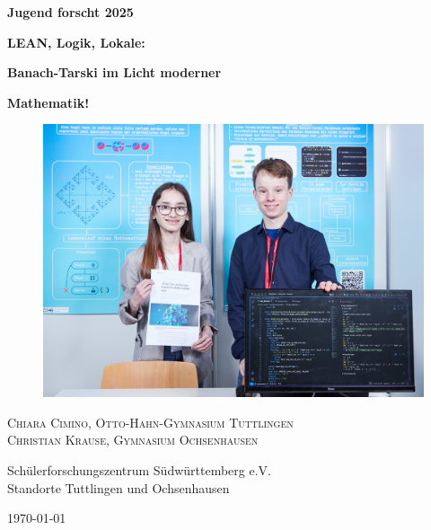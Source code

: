 \documentclass[hidelinks]{article}
\begin{document}
    \begin{center}

        \vspace{-3.1cm}

        \textbf{\Huge{\sc Jugend forscht 2025}}\\

        \vspace{1.4cm}

        \textbf{\Huge{LEAN, Logik, Lokale:}}
        \vspace{0.2 cm}

        \textbf{\Huge{Banach-Tarski im Licht moderner}}
        \vspace{0.3 cm}

        \textbf{\Huge{Mathematik!}}

        \vspace{0.5 cm}



        \vspace{0.4 cm}

    \end{center}





    \vspace{-0.4cm}
    \begin{figure}[ht]

        \centering

        \includegraphics[scale=0.5]{M-07.jpg}

    \end{figure}
    \begin{center}


        \Large\textsc{Chiara Cimino, Otto-Hahn-Gymnasium Tuttlingen\\Christian Krause, Gymnasium Ochsenhausen}\\\vspace{0.7cm}

        Schülerforschungszentrum Südwürttemberg e.V.\\Standorte Tuttlingen und Ochsenhausen  \vspace{1cm}

        \today

    \end{center}~
    \clearpage
\end{document}
